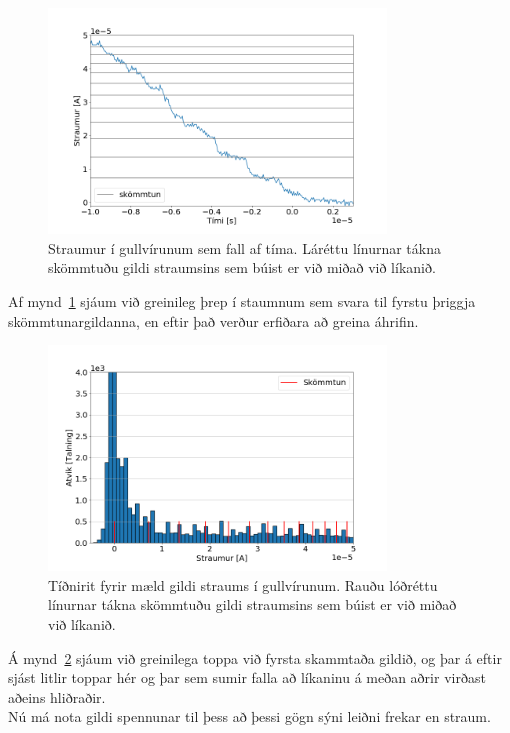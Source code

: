 \documentclass[11pt]{article}
\begin{document}
\begin{figure}[H]
    \centering
    \includegraphics[width=0.8\textwidth]{gull-straumur.png}
    \caption{Straumur í gullvírunum sem fall af tíma. Láréttu línurnar tákna skömmtuðu gildi straumsins sem búist er við miðað við líkanið.}
    \label{fig:gull_straumur}
\end{figure}

Af mynd~\ref{fig:gull_straumur} sjáum við greinileg þrep í staumnum sem svara til fyrstu þriggja skömmtunargildanna, en eftir það verður erfiðara að greina áhrifin. 

\begin{figure}[H]
    \centering
    \includegraphics[width=0.8\textwidth]{gull-hist-straumur.png}
    \caption{Tíðnirit fyrir mæld gildi straums í gullvírunum. Rauðu lóðréttu línurnar tákna skömmtuðu gildi straumsins sem búist er við miðað við líkanið.} 
    \label{fig:gull_hist_straumur}
\end{figure}

Á mynd~\ref{fig:gull_hist_straumur} sjáum við greinilega toppa við fyrsta skammtaða gildið, og þar á eftir sjást litlir toppar hér og þar sem sumir falla að líkaninu á meðan aðrir virðast aðeins hliðraðir. \\
Nú má nota gildi spennunar til þess að þessi gögn sýni leiðni frekar en straum.
\end{document}
